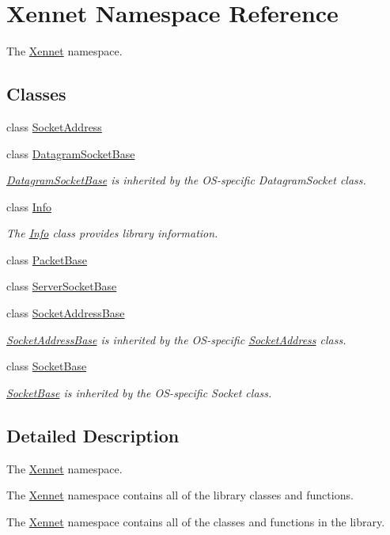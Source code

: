\hypertarget{namespaceXennet}{
\section{Xennet Namespace Reference}
\label{namespaceXennet}
}
The \hyperlink{namespaceXennet}{Xennet} namespace.  


\subsection*{Classes}
\begin{CompactItemize}
\item 
class \hyperlink{classXennet_1_1SocketAddress}{SocketAddress}
\item 
class \hyperlink{classXennet_1_1DatagramSocketBase}{DatagramSocketBase}
\begin{CompactList}\small\item\em \hyperlink{classXennet_1_1DatagramSocketBase}{DatagramSocketBase} is inherited by the OS-specific DatagramSocket class. \item\end{CompactList}\item 
class \hyperlink{classXennet_1_1Info}{Info}
\begin{CompactList}\small\item\em The \hyperlink{classXennet_1_1Info}{Info} class provides library information. \item\end{CompactList}\item 
class \hyperlink{classXennet_1_1PacketBase}{PacketBase}
\item 
class \hyperlink{classXennet_1_1ServerSocketBase}{ServerSocketBase}
\item 
class \hyperlink{classXennet_1_1SocketAddressBase}{SocketAddressBase}
\begin{CompactList}\small\item\em \hyperlink{classXennet_1_1SocketAddressBase}{SocketAddressBase} is inherited by the OS-specific \hyperlink{classXennet_1_1SocketAddress}{SocketAddress} class. \item\end{CompactList}\item 
class \hyperlink{classXennet_1_1SocketBase}{SocketBase}
\begin{CompactList}\small\item\em \hyperlink{classXennet_1_1SocketBase}{SocketBase} is inherited by the OS-specific Socket class. \item\end{CompactList}\end{CompactItemize}


\subsection{Detailed Description}
The \hyperlink{namespaceXennet}{Xennet} namespace. 

The \hyperlink{namespaceXennet}{Xennet} namespace contains all of the library classes and functions.

The \hyperlink{namespaceXennet}{Xennet} namespace contains all of the classes and functions in the library. 